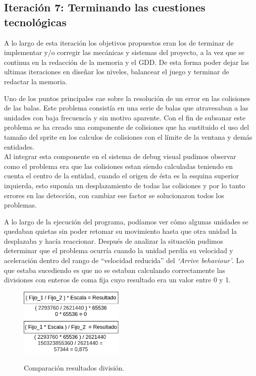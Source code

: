 \subsection*{Iteración 7: Terminando las cuestiones tecnológicas}
A lo largo de esta iteración los objetivos propuestos eran los de terminar de implementar y/o corregir
las mecánicas y sistemas del proyecto, a la vez que se continua en la redacción de la memoria y el GDD.
De esta forma poder dejar las ultimas iteraciones en diseñar los niveles, balancear el juego y terminar
de redactar la memoria.

Uno de los puntos principales cae sobre la resolución de un error en las colisiones de las balas.
Este problema consistía en una serie de balas que atravesaban a las unidades con baja frecuencía
y sin motivo aparente. Con el fin de subsanar este problema se ha creado una componente de colisiones
que ha sustituido el uso del tamaño del sprite en los calculos de colisiones con el límite de la 
ventana y demás entidades. \\
Al integrar esta componente en el sistema de debug visual pudimos observar como el problema era que las
colisiones estan siendo calculadas teniendo en cuenta el centro de la entidad, cuando el origen de ésta
es la esquina superior izquierda, esto suponía un desplazamiento de todas las colisiones y por lo tanto
errores en las detección, con cambiar ese factor se solucionaron todos los problemas.

A lo largo de la ejecución del programa, podíamos ver cómo algunas unidades se quedaban quietas sin poder
retomar su movimiento hasta que otra unidad la desplazaba y hacía reaccionar. Después de analizar la situación
pudimos determinar que el problema ocurría cuando la unidad perdía su velocidad y aceleración dentro del
rango de ``velocidad reducida'' del \textit{`Arrive behaviour'}. Lo que estaba sucediendo es que no se
estaban calculando correctamente las divisiones con enteros de coma fija cuyo resultado era un valor
entre 0 y 1.

\begin{figure}[ht]
\centering
\includegraphics[width=0.45\textwidth]{imagenes/diario_desarrollo/division_entera.png}\\
\caption{Comparación resultados división.}
\label{fig:div_int}
\end{figure}

